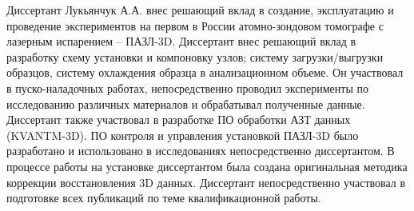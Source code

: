 {\contribution} Диссертант Лукьянчук А.А. внес решающий вклад в создание, эксплуатацию и проведение экспериментов на первом в России атомно-зондовом томографе с лазерным испарением – ПАЗЛ-3D. Диссертант внес решающий вклад в разработку схему установки и компоновку узлов; систему загрузки/выгрузки образцов, систему охлаждения образца в анализационном объеме. Он участвовал в  пуско-наладочных работах, непосредственно проводил эксперименты по исследованию различных материалов и обрабатывал полученные данные. Диссертант также участвовал в разработке ПО обработки АЗТ данных (KVANTM-3D). ПО контроля и управления установкой ПАЗЛ-3D было разработано и использовано в исследованиях непосредственно диссертантом. В процессе работы на установке диссертантом была создана оригинальная методика коррекции восстановления 3D данных. Диссертант непосредственно участвовал в подготовке всех публикаций по теме квалификационной работы.










